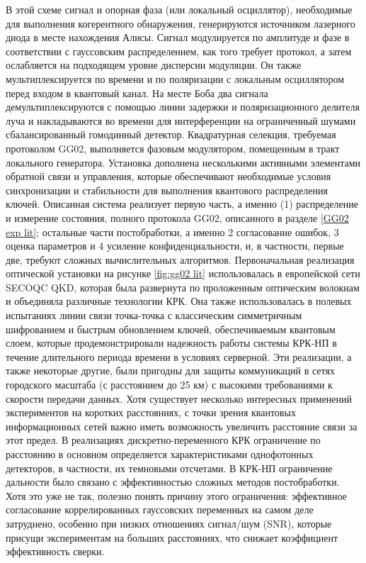В этой схеме сигнал и опорная фаза (или локальный осциллятор), необходимые для выполнения когерентного обнаружения, генерируются источником лазерного диода в месте нахождения Алисы. Сигнал модулируется по амплитуде и фазе в соответствии с гауссовским распределением, как того требует протокол, а затем ослабляется на подходящем уровне дисперсии модуляции. Он также мультиплексируется по времени и по поляризации с локальным осциллятором перед входом в квантовый канал. На месте Боба два сигнала демультиплексируются с помощью линии задержки и поляризационного делителя луча и накладываются во времени для интерференции на ограниченный шумами сбалансированный гомодинный детектор. Квадратурная селекция, требуемая протоколом GG02, выполняется фазовым модулятором, помещенным в тракт локального генератора. Установка дополнена несколькими активными элементами обратной связи и управления, которые обеспечивают необходимые условия синхронизации и стабильности для выполнения квантового распределения ключей. 
Описанная система реализует первую часть, а именно (1) распределение и измерение состояния, полного протокола GG02, описанного в разделе \ref{GG02 exp lit}; остальные части постобработки, а именно 2 согласование ошибок, 3 оценка параметров и 4 усиление конфиденциальности, и, в частности, первые две, требуют сложных вычислительных алгоритмов. Первоначальная реализация оптической установки на рисунке \ref{fig:gg02 lit} использовалась в европейской сети SECOQC QKD, которая была развернута по проложенным оптическим волокнам и объединяла различные технологии КРК. Она также использовалась в полевых испытаниях линии связи точка-точка с классическим симметричным шифрованием и быстрым обновлением ключей, обеспечиваемым квантовым слоем, которые продемонстрировали надежность работы системы КРК-НП в течение длительного периода времени в условиях серверной. Эти реализации, а также некоторые другие, были пригодны для защиты коммуникаций в сетях городского масштаба (с расстоянием до 25 км) с высокими требованиями к скорости передачи данных. Хотя существует несколько интересных применений экспериментов на коротких расстояниях, с точки зрения квантовых информационных сетей важно иметь возможность увеличить расстояние связи за этот предел. В реализациях дискретно-переменного КРК ограничение по расстоянию в основном определяется характеристиками однофотонных детекторов, в частности, их темновыми отсчетами. В КРК-НП ограничение дальности было связано с эффективностью сложных методов постобработки. Хотя это уже не так, полезно понять причину этого ограничения: эффективное согласование коррелированных гауссовских переменных на самом деле затруднено, особенно при низких отношениях сигнал/шум (SNR), которые присущи экспериментам на больших расстояниях, что снижает коэффициент эффективность сверки. 
